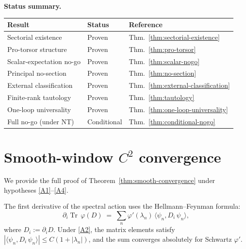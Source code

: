 \documentclass[12pt,a4paper]{article}
\theoremstyle{plain}
\theoremstyle{definition}
\theoremstyle{remark}
\newcommand{\Tr}{\operatorname{Tr}}
\begin{document}
\medskip

\noindent\textbf{Status summary.}
\begin{center}
\begin{tabular}{lll}
\toprule
\textbf{Result} & \textbf{Status} & \textbf{Reference} \\
\midrule
Sectorial existence & Proven & Thm.~\ref{thm:sectorial-existence} \\
Pro-torsor structure & Proven & Thm.~\ref{thm:pro-torsor} \\
Scalar-expectation no-go & Proven & Thm.~\ref{thm:scalar-nogo} \\
Principal no-section & Proven & Thm.~\ref{thm:no-section} \\
External classification & Proven & Thm.~\ref{thm:external-classification} \\
Finite-rank tautology & Proven & Thm.~\ref{thm:tautology} \\
One-loop universality & Proven & Thm.~\ref{thm:one-loop-universality} \\
Full no-go (under NT) & Conditional & Thm.~\ref{thm:conditional-nogo} \\
\bottomrule
\end{tabular}
\end{center}


\appendix

\section{Smooth-window \texorpdfstring{$C^2$}{C2} convergence}
\label{app:convergence}

We provide the full proof of Theorem~\ref{thm:smooth-convergence}
under hypotheses \ref{A1}--\ref{A4}.

The first derivative of the spectral action uses the
Hellmann--Feynman formula:
\begin{equation}
  \partial_i \Tr\,\varphi(D) \;=\;
  \sum_n \varphi'(\lambda_n)\,\langle\psi_n, D_i\,\psi_n\rangle,
\end{equation}
where $D_i := \partial_i D$.  Under \ref{A2}, the matrix elements
satisfy $|\langle\psi_n, D_i\,\psi_n\rangle| \le C(1+|\lambda_n|)$,
and the sum converges absolutely for Schwartz $\varphi'$.
\end{document}
